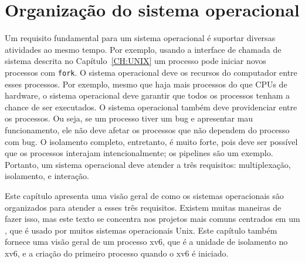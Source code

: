 
\chapter{Organização do sistema operacional}
\label{CH:FIRST}

Um requisito fundamental para um sistema operacional é suportar diversas atividades ao mesmo tempo. Por exemplo, usando a interface de chamada de sistema %
descrita no Capítulo~\ref{CH:UNIX}
um processo pode iniciar novos processos com 
\lstinline{fork}.
O sistema operacional deve 
os recursos do computador entre esses processos.
Por exemplo, mesmo que haja mais processos
do que CPUs de hardware, o sistema operacional
deve garantir que todos os processos
tenham a chance de ser executados.  O sistema operacional também deve providenciar
entre os processos.
Ou seja, se um processo tiver um bug e apresentar mau funcionamento, ele não deve afetar os processos que não dependem do processo com bug. O isolamento completo, entretanto, é muito forte, pois deve ser possível que os processos interajam intencionalmente; os pipelines são um exemplo.
Portanto, um sistema operacional deve atender a três requisitos: multiplexação, isolamento,
e interação.

Este capítulo apresenta uma visão geral de como os sistemas operacionais são
organizados para atender a esses três requisitos. Existem muitas maneiras de
fazer isso, mas este texto se concentra nos projetos mais comuns
centrados em um , que é usado por muitos sistemas
operacionais Unix. Este capítulo também fornece uma visão geral de um processo
xv6, que é a unidade de isolamento no xv6, e a criação
do primeiro processo quando o xv6 é iniciado.

